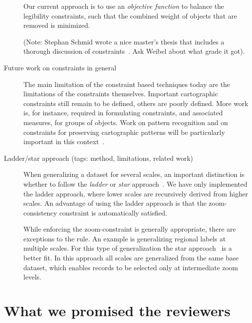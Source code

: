 \documentclass[11pt, oneside]{article}   	%
\begin{document}
\begin{description}
Our current approach is to use an \emph{objective function} to balance the legibility constraints, such that the combined weight of objects that are removed is minimized. 

(Note: Stephan Schmid wrote a nice master's thesis that includes a thorough discussion of constraints~\cite{schmid2008automated}. Ask Weibel about what grade it got).

\item[Future work on constraints in general] The main limitation of the constraint based techniques today are the limitations of the constraints themselves. Important cartographic constraints still remain to be defined, others are poorly defined. More work is, for instance, required in formulating constraints, and associated measures, for groups of objects. Work on pattern recognition and on constraints for preserving cartographic patterns will be particularly important in this context~\cite{harrie2007modelling}.

\item[Ladder/star approach (tags: method, limitations, related work)] When generalizing a dataset for several scales, an important distinction is whether to follow the \emph{ladder} or \emph{star} approach~\cite{foerster2010challenges}. We have only implemented the ladder approach, where lower scales are recursively derived from higher scales. An advantage of using the ladder approach is that the zoom-consistency constraint is automatically satisfied. 

While enforcing the zoom-constraint is generally appropriate, there are exceptions to the rule. An example is generalizing regional labels at multiple scales. For this type of generalization the star approach~\cite{foerster2010challenges} is a better fit. In this approach all scales are generalized from the same base dataset, which enables records to be selected only at intermediate zoom levels.

\end{description}

\section{What we promised the reviewers}
\end{document}

